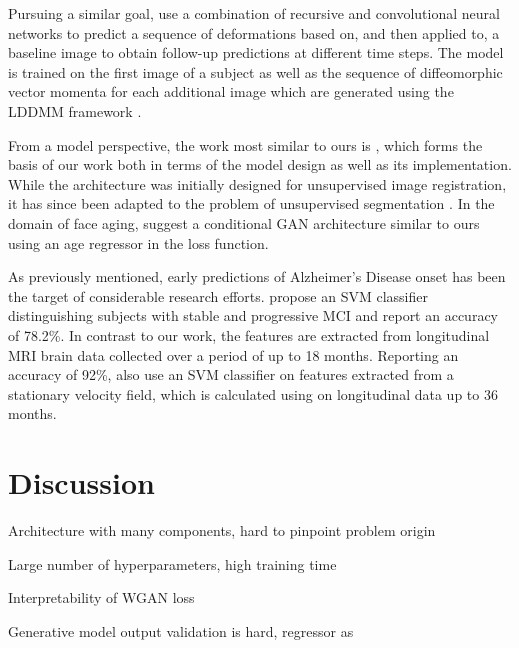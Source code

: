 Pursuing a similar goal, \cite{pathan2018predictive} use a combination of recursive and convolutional neural networks to predict a sequence of deformations based on, and then applied to, a baseline image to obtain follow-up predictions at different time steps. The model is trained on the first image of a subject as well as the sequence of diffeomorphic vector momenta for each additional image which are generated using the LDDMM framework \cite{beg2005computing}.

From a model perspective, the work most similar to ours is \cite{balakrishnan2019voxelmorph} \cite{dalca2018unsupervised}, which forms the basis of our work both in terms of the model design as well as its implementation. While the architecture was initially designed for unsupervised image registration, it has since been adapted to the problem of unsupervised segmentation \cite{dalca2019unsupervised}.
In the domain of face aging, \cite{palsson2018generative} suggest a conditional GAN \cite{mirza2014conditional} architecture similar to ours using an age regressor in the loss function.

As previously mentioned, early predictions of Alzheimer's Disease onset has been the target of considerable research efforts. \cite{thung2016identification} propose an SVM classifier distinguishing subjects with stable and progressive MCI and report an accuracy of 78.2\%. In contrast to our work, the features are extracted from longitudinal MRI brain data collected over a period of up to 18 months.
Reporting an accuracy of 92\%, \cite{sun2017detection} also use an SVM classifier on features extracted from a stationary velocity field, which is calculated using \cite{vercauteren2009diffeomorphic} on longitudinal data up to 36 months.

\chapter{Discussion}
Architecture with many components, hard to pinpoint problem origin

Large number of hyperparameters, high training time

Interpretability of WGAN loss

Generative model output validation is hard, regressor as 
